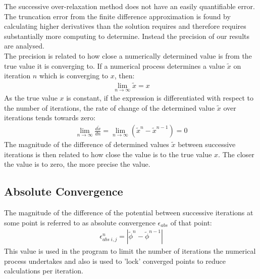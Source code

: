 The successive over-relaxation method does not have an easily quantifiable error. The truncation error from the finite difference approximation is found by calculating higher derivatives than the solution requires and therefore requires substantially more computing to determine. Instead the precision of our results are analysed.
\\
The precision is related to how close a numerically determined value is from the true value it is converging to. If a numerical process determines a value $\tilde{x}$ on iteration $n$ which is converging to $x$, then:
\begin{align*}
\lim_{n \rightarrow \infty}\tilde{x} = x                     
\end{align*}
As the true value $x$ is constant, if the expression is differentiated with respect to the number of iterations, the rate of change of the determined value $\tilde{x}$ over iterations tends towards zero:
\begin{align*}
\lim_{n \rightarrow \infty}\frac{d\tilde{x}}{dn} = \lim_{n \rightarrow \infty} (\tilde{x}^{n} - \tilde{x}^{n-1}) = 0                     
\end{align*}
The magnitude of the difference of determined values $\tilde{x}$ between successive iterations is then related to how close the value is to the true value $x$. The closer the value is to zero, the more precise the value.
\subsection{Absolute Convergence}
The magnitude of the difference of the potential between successive iterations at some point is referred to as absolute convergence $\epsilon_{abs}$ of that point:
\begin{align*}
\epsilon_{abs \; i,j}^{n} = |\tilde{\phi}^{n} - \tilde{\phi}^{n-1}|
\end{align*}
This value is used in the program to limit the number of iterations the numerical process undertakes and also is used to 'lock' converged points to reduce calculations per iteration.
